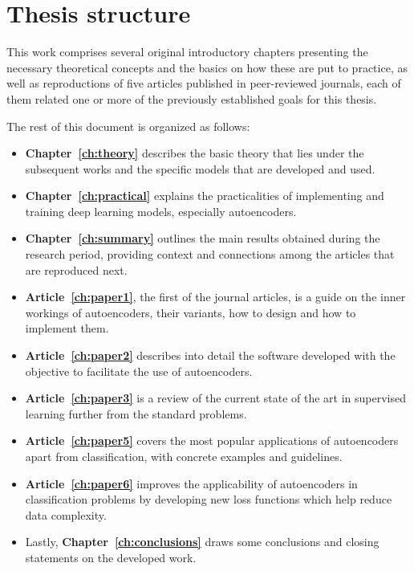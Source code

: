 \section{Thesis structure}

This work comprises several original introductory chapters presenting the necessary theoretical concepts and the basics on how these are put to practice, as well as reproductions of five articles published in peer-reviewed journals, each of them related one or more of the previously established goals for this thesis.

The rest of this document is organized as follows: %

\begin{itemize}
    \item \textbf{Chapter~\ref{ch:theory}} describes the basic theory that lies under the subsequent works and the specific models that are developed and used.
    \item \textbf{Chapter~\ref{ch:practical}} explains the practicalities of implementing and training deep learning models, especially autoencoders.
    \item \textbf{Chapter~\ref{ch:summary}} outlines the main results obtained during the research period, providing context and connections among the articles that are reproduced next.
    \item \textbf{Article~\ref{ch:paper1}}, the first of the journal articles, is a guide on the inner workings of autoencoders, their variants, how to design and how to implement them.
    \item \textbf{Article~\ref{ch:paper2}} describes into detail the software developed with the objective to facilitate the use of autoencoders.
    \item \textbf{Article~\ref{ch:paper3}} is a review of the current state of the art in supervised learning further from the standard problems.
    \item \textbf{Article~\ref{ch:paper5}} covers the most popular applications of autoencoders apart from classification, with concrete examples and guidelines.
    \item \textbf{Article~\ref{ch:paper6}} improves the applicability of autoencoders in classification problems by developing new loss functions which help reduce data complexity.
    \item Lastly, \textbf{Chapter~\ref{ch:conclusions}} draws some conclusions and closing statements on the developed work.
\end{itemize}